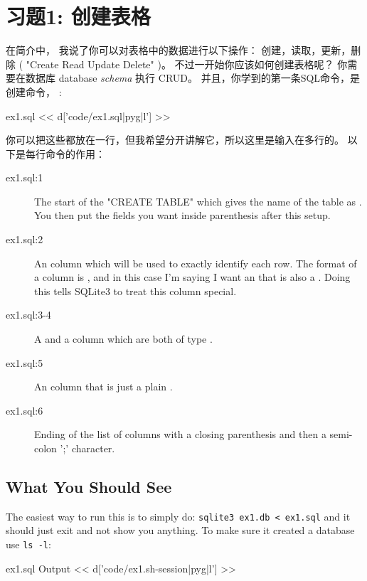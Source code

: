 \chapter{习题1: 创建表格}

在简介中， 我说了你可以对表格中的数据进行以下操作： 创建，读取，更新，删除 ( "Create Read Update Delete" )。 不过一开始你应该如何创建表格呢？ 你需要在数据库 database \emph{schema} 执行 CRUD。 并且，你学到的第一条SQL命令，是创建命令， :

\begin{code}{ex1.sql}
<< d['code/ex1.sql|pyg|l'] >>
\end{code}

你可以把这些都放在一行，但我希望分开讲解它，所以这里是输入在多行的。 以下是每行命令的作用：

\begin{description}
\item[ex1.sql:1] The start of the "CREATE TABLE" which gives the name of the
    table as . You then put the fields you want inside parenthesis
    after this setup.
\item[ex1.sql:2] An  column which will be used to exactly identify
    each row.  The format of a column is , and in this case
    I'm saying I want an  that is also a .
    Doing this tells SQLite3 to treat this column special.
\item[ex1.sql:3-4] A  and a  column 
    which are both of type .
\item[ex1.sql:5] An  column that is just a plain .
\item[ex1.sql:6] Ending of the list of columns with a closing parenthesis and
    then a semi-colon ';' character.
\end{description}


\section{What You Should See}

The easiest way to run this is to simply do: \verb|sqlite3 ex1.db < ex1.sql| and
it should just exit and not show you anything.  To make sure it created a
database use \verb|ls -l|:


\begin{code}{ex1.sql Output}
<< d['code/ex1.sh-session|pyg|l'] >>
\end{code}


